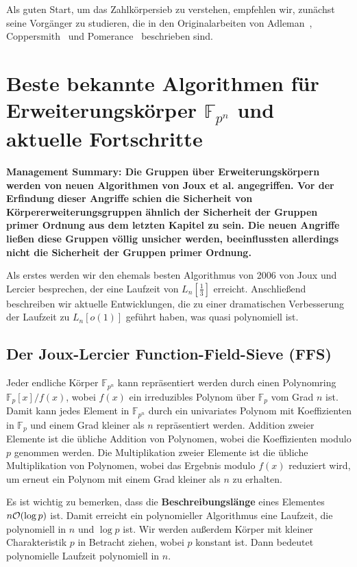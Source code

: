 \begin{refsegment}
Als guten Start, um das Zahlkörpersieb zu verstehen, empfehlen wir, zunächst seine Vorgänger zu studieren, die in den Originalarbeiten von Adleman~\cite{Adleman1979}, Coppersmith~\cite{CoppersmithOS1986} und Pomerance~\cite{Pomerance1984,Pomerance1996} beschrieben sind.


\newpage
\section{\texorpdfstring{Beste bekannte Algorithmen für Erweiterungskörper $\mathbb{F}_{p^n}$ und aktuelle Fortschritte}
                        {Beste bekannte Algorithmen für Erweiterungskörper Fpn und aktuelle Fortschritte}}
\label{ffs}
\textbf{Management Summary: Die Gruppen über Erweiterungskörpern werden von neuen Algorithmen von Joux et al. angegriffen. Vor der Erfindung dieser Angriffe schien die Sicherheit von Körpererweiterungsgruppen ähnlich der Sicherheit der Gruppen primer Ordnung aus dem letzten Kapitel zu sein. Die neuen Angriffe ließen diese Gruppen völlig unsicher werden, beeinflussten allerdings nicht die Sicherheit der Gruppen primer Ordnung.\\[0.1cm]}

Als erstes werden wir den ehemals besten Algorithmus von 2006 von Joux und Lercier besprechen, der eine Laufzeit von $L_n[\frac 1 3]$ erreicht. Anschließend beschreiben wir aktuelle Entwicklungen, die zu einer dramatischen Verbesserung der Laufzeit zu $L_n[o(1)]$ geführt haben, was quasi polynomiell ist.


\subsection{Der Joux-Lercier Function-Field-Sieve (FFS)}
Jeder endliche Körper $\mathbb{F}_{p^n}$ kann repräsentiert werden durch einen Polynomring $\mathbb{F}_p[x]/f(x)$, wobei $f(x)$ ein irreduzibles Polynom über $\mathbb{F}_p$ vom Grad $n$ ist. Damit kann jedes Element in $\mathbb{F}_{p^n}$ durch ein univariates Polynom mit Koeffizienten in $\mathbb{F}_p$ und einem Grad kleiner als $n$ repräsentiert werden. Addition zweier Elemente ist die übliche Addition von Polynomen, wobei die Koeffizienten modulo $p$ genommen werden. Die Multiplikation zweier Elemente ist die übliche Multiplikation von Polynomen, wobei das Ergebnis modulo $f(x)$ reduziert wird, um erneut ein Polynom mit einem Grad kleiner als $n$ zu erhalten.

Es ist wichtig zu bemerken, dass die \textbf{Beschreibungslänge} eines Elementes $n {\cal O}(\log p)$ ist. Damit erreicht ein polynomieller Algorithmus eine Laufzeit, die polynomiell in $n$ und $\log p$ ist. Wir werden außerdem Körper mit kleiner Charakteristik $p$ in Betracht ziehen, wobei $p$ konstant ist. Dann bedeutet polynomielle Laufzeit polynomiell in $n$.


\end{refsegment}
